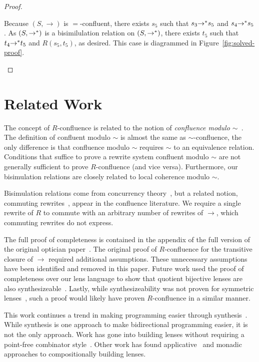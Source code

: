 \documentclass{easychair}
\begin{document}
\begin{proof}
\begin{case}
    Because $(S,\rightarrow)$ is $=$-confluent, there
    exists $s_5$ such that $s_3 {\rightarrow}^* s_5$ and $s_4
    {\rightarrow}^* s_5$. As $(S,{\rightarrow}^*)$ is a bisimilulation
    relation on $(S,{\rightarrow}^*)$,
    there exists $t_5$ such that $t_4 {\rightarrow}^* t_5$ and
    $R(s_5,t_5)$, as desired. This case is diagrammed in
    Figure~\ref{fig:solved-proof}.
  \end{case}
\end{proof}

\section{Related Work}

The concept of $R$-confluence is related to the notion of \emph{confluence
  modulo $\sim$}~\cite{huetconf}. The definition of confluent modulo $\sim{}$ is
almost the same as $\sim$-confluence, the only difference is that confluence
modulo $\sim{}$ requires $\sim{}$ to an equivalence relation. Conditions that suffice to prove a rewrite system confluent modulo
$\sim$ are not generally sufficient to prove $R$-confluence (and vice versa).
Furthermore, our bisimulation relations are closely related to local coherence
modulo $\sim{}$.

Bisimulation relations come from concurrency theory~\cite{bisimcoind}, but a
related notion, commuting rewrites~\cite{commut}, appear in the confluence
literature. We require a single rewrite of $R$ to commute with an arbitrary
number of rewrites of $\rightarrow$, which commuting rewrites do not express.

The full proof of completeness is contained in the appendix of the full version
of the original optician paper~\cite{extended-version}. The original proof of
$R$-confluence for the transitive closure of $\rightarrow$ required
additional assumptions. These unnecessary assumptions have been identified and
removed in this paper. Future work used the proof of completeness
over our lens language to show that quotient bijective lenses are also
synthesizeable~\cite{maina+:quotient-synthesis}. Lastly, while synthesizeability
was not proven for symmetric lenses~\cite{soptician}, such a proof would likely
have proven $R$-confluence in a similar manner.

This work continues a trend in making programming easier through
synthesis~\cite{gulwani2017program}. While synthesis is one approach to make
bidirectional programming easier, it is not the only approach. Work has
gone into building lenses without requiring a point-free combinator
style~\cite{10.1007/978-3-319-89884-1_2}. Other work has found
applicative~\cite{10.1145/2858949.2784750} and
monadic~\cite{10.1007/978-3-030-17184-1_6} approaches to compositionally
building lenses.
\end{document}

